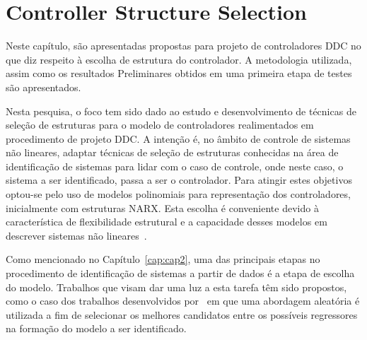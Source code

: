 
\chapter{Controller Structure Selection}\label{cap:CCS}
\vspace{-1cm}

%
%


Neste capítulo, são apresentadas propostas para projeto de controladores DDC no que diz respeito à escolha de estrutura do controlador. A metodologia utilizada, assim como os resultados Preliminares obtidos em uma primeira etapa de testes são apresentados.

Nesta pesquisa, o foco tem sido dado ao estudo e desenvolvimento de técnicas de seleção de estruturas para o modelo de controladores realimentados em procedimento de projeto DDC\@.
A intenção é, no âmbito de controle de sistemas não lineares, adaptar técnicas de seleção de estruturas conhecidas na área de identificação de sistemas para lidar com o caso de controle, onde neste caso, o sistema a ser identificado, passa a ser o controlador. Para atingir estes objetivos optou-se pelo uso de modelos polinomiais para representação dos controladores, inicialmente com estruturas NARX\@. Esta escolha é conveniente devido à característica de flexibilidade estrutural e a capacidade desses modelos em descrever sistemas não lineares~\citep{pearson1999,martins2013}.
%

Como mencionado no Capítulo~\ref{cap:cap2}, uma das principais etapas no procedimento de identificação de sistemas a partir de dados é a etapa de escolha do modelo. Trabalhos que visam dar uma luz a esta tarefa têm sido propostos, como o caso dos trabalhos desenvolvidos por~\cite{falsone2014,falsone2015} em que uma abordagem aleatória é utilizada a fim de selecionar os melhores candidatos entre os possíveis regressores na formação do modelo a ser identificado.

